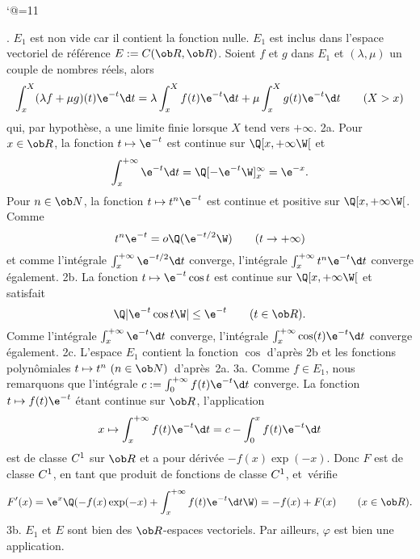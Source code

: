 \catcode`@=11\relax



\def\LD@Maths@Exercice@Display{\ignorespaces\LD@Exo@@Exo}%


\vglue-10mm%
\bigskip
\bigskip
\vfill
{}.  $E_1$ est non vide car il contient la fonction nulle. \pn 
$E_1$ est inclus dans l'espace vectoriel de r\'ef\'erence $E:=\sc C(\ob R,\ob R)$. \pn
Soient $f$ et $g$ dans $E_1$ et $(\lambda,\mu) $
un couple de nombres r\'eels, alors
$$
\int_x^X(\lambda f+\mu g)(t)\e^{-t}\d t=\lambda\int_x^Xf(t)\e^{-t}\d t+
\mu \int_x^Xg(t)\e^{-t}\d t\qquad(X>x)
$$
qui, par hypoth\`ese, a une limite finie lorsque $X$ tend vers $+\infty $.
\bigskip
\noindent
2a.  Pour $x\in\ob R$, la fonction $t\mapsto\e^{-t}$ est continue sur $\Q[x,+\infty\W[$ et 
$$
\int_x^{+\infty}\e^{-t}\d t=\Q[-\e^{-t}\W]_x^{\infty}=\e^{-x}.
$$ 
\bigskip
\noindent
Pour $n\in\ob N$, la fonction $t\mapsto t^n\e^{-t}$ est continue et positive sur $\Q[x,+\infty\W[$. Comme 
$$
t^n\e^{-t}=o\Q(\e^{-t/2}\W)\qquad(t\to+\infty)
$$ 
et comme l'int\'egrale $\int_x^{+\infty}\e^{-t/2}\d t$ converge, l'int\'egrale  $\int_x^{+\infty}t^n\e^{-t}\d t$ converge \'egalement. 
\bigskip
\noindent
2b. La fonction $t\mapsto \e^{-t}\cos t$ est continue sur $\Q[x,+\infty \W[$ et satisfait 
$$
\Q|\e^{-t}\cos t\W|\le \e^{-t}\qquad(t\in\ob R).
$$ 
Comme l'int\'egrale $\int_x^{+\infty}\e^{-t}\d t$ converge, l'int\'egrale  $\int_x^{+\infty}\cos(t)\e^{-t}\d t$ converge \'egalement. 
\bigskip
\noindent
2c. L'espace $E_1$ contient la fonction $\cos$ d'apr\`es 2b et les fonctions polyn\^omiales $t\mapsto t^n\  (n\in\ob N)$~d'apr\`es~2a.
\bigskip
\noindent
3a. Comme $f\in E_1$, nous remarquons que l'int\'egrale $c:=\int_0^{+\infty}f(t)\e^{-t}\d t$ converge. \pn
La fonction $t\mapsto f(t)\e^{-t}$ \'etant continue sur $\ob R$, l'application  
$$
x\mapsto \int_x^{+\infty }
f(t)\e^{-t}\d t=c-\int_0^xf(t)\e^{-t}\d t
$$ 
est de classe $\sc C^1$ sur $\ob R$ et a pour d\'eriv\'ee $-f(x)\exp(-x)$. 
Donc $F$ est de classe $\sc C^1$, en tant que produit de fonctions de classe $\sc C^1$, et~v\'erifie 
$$
F'(x)=\e^x\Q(-f(x)\exp(-x)+\int_x^{+\infty }f(t)\e^{-t}\d t\W)=-f(x)+F(x)\qquad (x\in\ob R).
$$
3b.  $E_1$ et $E$ sont bien des $\ob R$-espaces vectoriels. Par ailleurs, $\varphi$ est bien une application.
